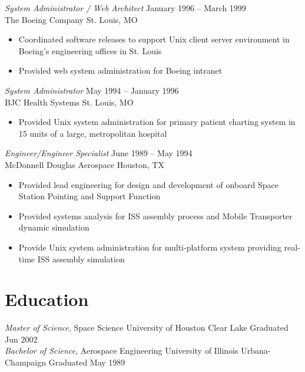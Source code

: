 \documentclass[margin,line]{resume}
\begin{document}
\begin{resume}
{\sl System Administrator / Web Architect} \hfill January 1996 -- March 1999\\
The Boeing Company \hfill St. Louis, MO
\begin{itemize} \itemsep -2pt %
\small\item Coordinated software releases to support Unix client server environment in Boeing’s engineering offices in St. Louis
\small\item Provided web system administration for Boeing intranet
\end{itemize}

{\sl System Administrator} \hfill May 1994 -- January 1996\\
BJC Health Systems \hfill St. Louis, MO

\begin{itemize} \itemsep -2pt %
\small\item Provided Unix system administration for primary patient charting system in 15 units of a large, metropolitan hospital
\end{itemize}

{\sl Engineer/Engineer Specialist} \hfill June 1989 -- May 1994\\
McDonnell Douglas Aerospace \hfill Houston, TX
\begin{itemize} \itemsep -2pt %
\small\item Provided lead engineering for design and development of onboard Space Station Pointing and Support Function
\small\item Provided systems analysis for ISS assembly process and Mobile Transporter dynamic simulation
\small\item Provide Unix system administration for multi-platform system providing real-time ISS assembly simulation
\end{itemize}

\section{Education}
{\small
  {\sl Master of Science}, Space Science \hfill
  University of Houston Clear Lake \hfill
  Graduated Jun 2002\\
}
{\small
  {\sl Bachelor of Science}, Aerospace Engineering \hfill
  University of Illinois Urbana-Champaign \hfill
  Graduated May 1989\\
}


\end{resume}
\end{document}
